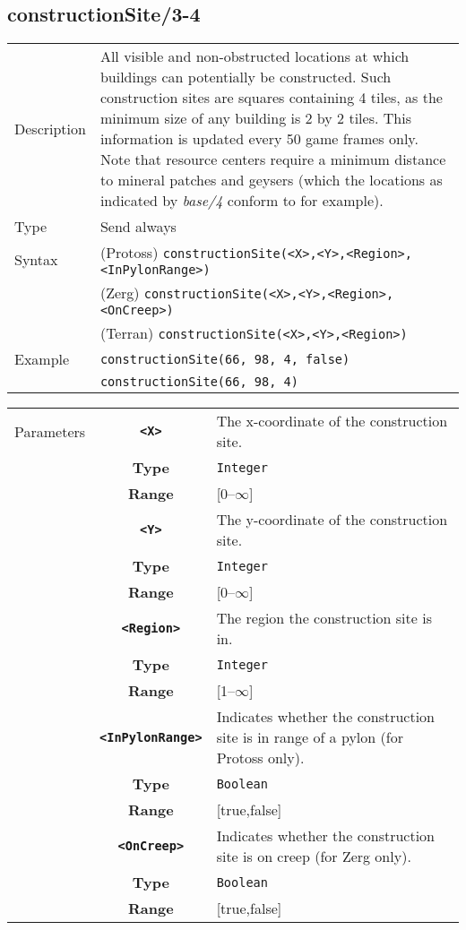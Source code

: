 \subsection{constructionSite/3-4}
\begin{tabularx}{\textwidth}{lX}
 Description & All visible and non-obstructed locations at which buildings can potentially be constructed. Such construction sites are squares containing 4 tiles, as the minimum size of any building is 2 by 2 tiles. This information is updated every 50 game frames only. Note that resource centers require a minimum distance to mineral patches and geysers (which the locations as indicated by \textit{base/4} conform to for example). \\
 Type & Send always \\
 Syntax & (Protoss) \verb|constructionSite(<X>,<Y>,<Region>,<InPylonRange>)| \\
        & (Zerg) \verb|constructionSite(<X>,<Y>,<Region>,<OnCreep>)|\\
        & (Terran) \verb|constructionSite(<X>,<Y>,<Region>)| \\
 Example & \verb|constructionSite(66, 98, 4, false)| \\
         & \verb|constructionSite(66, 98, 4)| \\
 \end{tabularx}
 \begin{tabularx}{\textwidth}{l | c | p{8cm}|}
 \cline{2-3}
 Parameters & \textbf{\verb|<X>|} & The x-coordinate of the construction site.\\
            & \textbf{Type} & \verb|Integer| \\
            & \textbf{Range} & [0--$\infty$] \\
            \cline{2-3}
            & \textbf{\verb|<Y>|} & The y-coordinate of the construction site.\\
            & \textbf{Type} & \verb|Integer| \\
            & \textbf{Range} & [0--$\infty$] \\
            \cline{2-3}
            & \textbf{\verb|<Region>|} & The region the construction site is in.\\
            & \textbf{Type} & \verb|Integer| \\
            & \textbf{Range} & [1--$\infty$] \\
            \cline{2-3}
            & \textbf{\verb|<InPylonRange>|} & Indicates whether the construction site is in range of a pylon (for Protoss only). \\
            & \textbf{Type} & \verb|Boolean| \\
            & \textbf{Range} & [true,false] \\
            \cline{2-3}
            & \textbf{\verb|<OnCreep>|} & Indicates whether the construction site is on creep (for Zerg only). \\
            & \textbf{Type} & \verb|Boolean| \\
            & \textbf{Range} & [true,false] \\
            \cline{2-3}
\end{tabularx}


